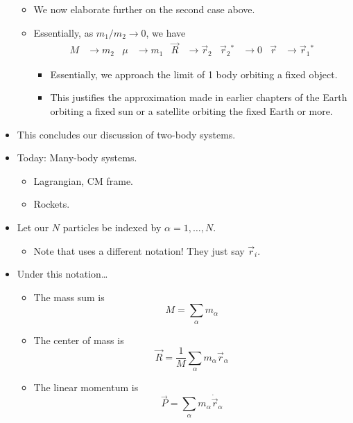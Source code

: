 \documentclass[../notes.tex]{subfiles}
\begin{document}
\begin{itemize}
\begin{itemize}
        \item We now elaborate further on the second case above.
        \item Essentially, as $m_1/m_2\to 0$, we have
        \begin{align*}
            M &\to m_2&
            \mu &\to m_1&
            \vec{R} &\to \vec{r}_2&
            \vec{r}_2{}^* &\to 0&
            \vec{r} &\to \vec{r}_1{}^*
        \end{align*}
        \begin{itemize}
            \item Essentially, we approach the limit of 1 body orbiting a fixed object.
            \item This justifies the approximation made in earlier chapters of the Earth orbiting a fixed sun or a satellite orbiting the fixed Earth or more.
        \end{itemize}
    \end{itemize}
    \item This concludes our discussion of two-body systems.
    \item Today: Many-body systems.
    \begin{itemize}
        \item Lagrangian, CM frame.
        \item Rockets.
    \end{itemize}
    \item Let our $N$ particles be indexed by $\alpha=1,\dots,N$.
    \begin{itemize}
        \item Note that \textcite{bib:KibbleBerkshire} uses a different notation! They just say $\vec{r}_i$.
    \end{itemize}
    \item Under this notation\dots
    \begin{itemize}
        \item The mass sum is
        \begin{equation*}
            M = \sum_\alpha m_\alpha
        \end{equation*}
        \item The center of mass is
        \begin{equation*}
            \vec{R} = \frac{1}{M}\sum_\alpha m_\alpha\vec{r}_\alpha
        \end{equation*}
        \item The linear momentum is
        \begin{equation*}
            \vec{P} = \sum_\alpha m_\alpha\dot{\vec{r}}_\alpha

\end{equation*}
\end{itemize}
\end{itemize}
\end{document}

